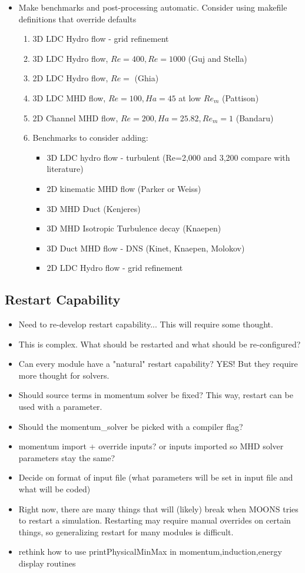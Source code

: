 \documentclass[11pt]{article}
\begin{document}
\begin{itemize}
\setlength\itemsep{-1em}
\item Make benchmarks and post-processing automatic. Consider using makefile definitions that override defaults
\begin{enumerate}
\setlength\itemsep{-1em}
\item 3D LDC Hydro flow - grid refinement
\item 3D LDC Hydro flow, $Re = 400, Re = 1000$ (Guj and Stella)
\item 2D LDC Hydro flow, $Re = $ (Ghia)
\item 3D LDC MHD flow, $Re = 100, Ha = 45$ at low $Re_m$ (Pattison)
\item 2D Channel MHD flow, $Re = 200, Ha = 25.82, Re_m = 1$ (Bandaru)
\item Benchmarks to consider adding:
\begin{itemize}
\setlength\itemsep{-1em}
\item 3D LDC hydro flow - turbulent (Re=2,000 and 3,200 compare with literature)
\item 2D kinematic MHD flow (Parker or Weiss)
\item 3D MHD Duct (Kenjeres)
\item 3D MHD Isotropic Turbulence decay (Knaepen)
\item 3D Duct MHD flow - DNS (Kinet, Knaepen, Molokov)
\item 2D LDC Hydro flow - grid refinement
\end{itemize}
\end{enumerate}
\end{itemize}


\subsection{Restart Capability}
\begin{itemize}
\setlength\itemsep{-1em}
\item Need to re-develop restart capability... This will require some thought.
\item This is complex. What should be restarted and what should be re-configured?
\item Can every module have a "natural" restart capability? YES! \Checkmark But they require more thought for solvers.
\item Should source terms in momentum solver be fixed? This way, restart can be used with a parameter.
\item Should the momentum\_solver be picked with a compiler flag?
\item momentum import + override inputs? or inputs imported so MHD solver parameters stay the same?
\item Decide on format of input file (what parameters will be set in input file and what will be coded)
\item Right now, there are many things that will (likely) break when MOONS tries to restart a simulation. Restarting may require manual overrides on certain things, so generalizing restart for many modules is difficult.
\item rethink how to use printPhysicalMinMax in momentum,induction,energy display routines
\end{itemize}
\end{document}
